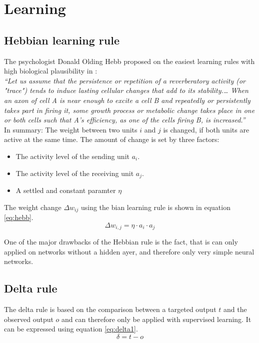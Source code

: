 \documentclass[10pt,a4paper,DIV=11]{scrreprt}
\begin{document}
\section{Learning}\label{sec:learning}
\subsection{Hebbian learning rule}
The psychologist Donald Olding Hebb proposed on the easiest learning rules with high biological plausibility in \cite{HEBB}:\\

\textit{“Let us assume that the persistence or repetition of a reverberatory activity (or "trace") tends to induce lasting cellular changes that add to its stability.… When an axon of cell A is near enough to excite a cell B and repeatedly or persistently takes part in firing it, some growth process or metabolic change takes place in one or both cells such that A's efficiency, as one of the cells firing B, is increased.”}\\

In summary: The weight between two units $i$ and $j$ is changed, if both units are active at the same time. The amount of change is set by three factors:

\begin{itemize}
\item The activity level of the sending unit $a_i$.
\item The activity level of the receiving unit $a_j$.
\item A settled and constant paramter $\eta$
\end{itemize}

The weight change $\Delta w_{ij}$ using the bian learning rule is shown in equation \eqref{eq:hebb}.
\begin{equation}
\Delta w_{i,j} = \eta \cdot a_i \cdot a_j
\label{eq:hebb}
\end{equation}

One of the major drawbacks of the Hebbian rule is the fact, that is can only applied on networks without a hidden ayer, and therefore only very simple neural networks.

\subsection{Delta rule}
The delta rule is based on the comparison between a targeted output $t$ and the observed output $o$ and can therefore only be applied with supervised learning.
It can be expressed using equation \eqref{eq:delta1}.
\begin{equation}
\delta = t - o
\label{eq:delta1}
\end{equation}
\end{document}
